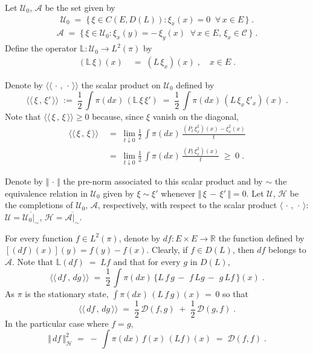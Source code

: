 \documentclass[reqno]{amsart}
\newcounter{as}[section]
\newcommand{\mc}[1]{{\mathcal #1}}
\newcommand{\bb}[1]{{\mathbb #1}}
\newcommand{\ms}[1]{{\mathscr #1}}
\newcommand{\<}{\langle}
\renewcommand{\>}{\rangle}
\begin{document}
\newpage

Let $\ms U_0$, $\ms A$ be the set given by
\begin{gather*}
\ms U_0\;=\; \big\{\, \xi \in C(E, D(L)) : \xi_x(x) =0 \;\; \forall \, x\in
E \,\big\} \;.
\end{gather*}
\begin{gather*}
\ms A\;=\; \big\{\, \xi \in \ms U_0  : \xi_x(y) =-\,\xi_y(x) \;\; \forall \, x\in
E,\,\xi_x\in \mathcal C \,\big\} \;.
\end{gather*}
Define the operator $\bb L: \ms U_0 \to L^2(\pi)$ by
\begin{align*}
(\bb L \, \xi)(x) \; & =\; (L\, \xi_x )(x) \;, \quad x\in E  \;.
\end{align*}

Denote by $\<\!\<\,\cdot\,,\,\cdot\,\>\!\>$ the scalar product on
$\ms U_0$ defined by
\begin{equation*}
\<\!\<\, \xi \,,\, \xi' \,\>\!\> \;:=\; 
\frac 12\, \int \pi(dx)\, (\bb L \, \xi\, \xi') 
\;=\; \frac 12\, \int \pi(dx)\, (L \, \xi_x\, \xi'_x) (x)\;.
\end{equation*}
Note that $\<\!\<\, \xi \,,\, \xi \,\>\!\> \ge 0$ because, since $\xi$
vanish on the diagonal,
\begin{align*}
\<\!\<\, \xi \,,\, \xi \,\>\!\> \; & =\; \lim_{t\downarrow 0}
\frac 12\, \int \pi(dx)\, \frac{ (P_t \, \xi^2_x ) (x) - \xi^2_x
  (x)}{t} \\
& =\; \lim_{t\downarrow 0}
\frac 12\, \int \pi(dx)\, \frac{ (P_t \, \xi^2_x ) (x)}{t} \;\ge\;
0\;. 
\end{align*}

Denote by $\Vert \,\cdot\,\Vert$ the pre-norm associated to this
scalar product and by $\sim$ the equivalence relation in $\ms U_0$
given by $\xi \sim\xi'$ whenever $\Vert \, \xi \,-\, \xi' \,\Vert
=0$. Let $\ms U$, $\ms H$ be the completions of $\ms U_0$, $\ms A$,
respectively, with respect to the scalar product
$\<\,\cdot\,,\,\cdot\,\>$: $\ms U = \overline{\ms U_0 \big|_\sim}$,
$\ms H = \overline{\ms A \big|_\sim}$.

For every function $f\in L^2(\pi)$, denote by $df \colon E\times E \to
\bb R$ the function defined by $[(df)(x)] (y) = f(y)-f(x)$. Clearly,
if $f\in D(L)$, then $df$ belongs to $\ms A$. Note that $\bb L(df)
\;=\; L f$ and that for every $g$ in $D(L)$, 
\begin{equation*}
\<\!\<\, df \,,\, dg  \,\>\!\> \;=\;
\frac 12\, \int \pi(dx)\, \big \{ L \, f\, g  
\,-\, \, f\, L g \,-\, \, g\, L f \, \big\} (x)\;.
\end{equation*}
As $\pi$ is the stationary state, $\int \pi(dx)\, (L \, f\, g)(x) \,=\,
0$ so that
\begin{equation}
\label{10}
\<\!\<\, df \,,\, dg  \,\>\!\> \;=\;
\frac 12 \, \mc D(f,g) \;+\; \frac 12 \, \mc D(g,f)\;.
\end{equation}
In the particular case where $f=g$,
\begin{equation}
\label{05}
\big\Vert\, df \, \big\Vert_{\ms H}^2 \;=\;
- \, \int \pi(dx)\, f(x) \, (L f) (x) \;=\; \mc D(f,f)\;.
\end{equation}
\medskip
\end{document}
